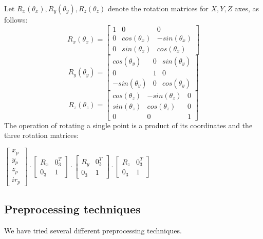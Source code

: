         Let $R_x(\theta_x), R_y(\theta_y), R_z(\theta_z)$ denote the rotation matrices
        for $X, Y, Z$ axes, as follows:
        \[
        R_x(\theta_x) =
        \begin{bmatrix}
        1 & 0 & 0\\
        0 & cos(\theta_x) & -sin(\theta_x)\\
        0 & sin(\theta_x) & cos(\theta_x)
        \end{bmatrix}
        \]
        \[
        R_y(\theta_y) =
        \begin{bmatrix}
        cos(\theta_y) & 0 & sin(\theta_y)\\
        0 & 1 & 0\\
        -sin(\theta_y) & 0 & cos(\theta_y)
        \end{bmatrix}
        \]
        \[
        R_z(\theta_z) =
        \begin{bmatrix}
        cos(\theta_z) & -sin(\theta_z) & 0\\
        sin(\theta_z) & cos(\theta_z) & 0\\
        0 & 0 & 1
        \end{bmatrix}
        \]
        The operation of rotating a single point is a product of its coordinates and the three rotation matrices:
        \begin{center}
        $
        \begin{bmatrix}
          x_p\\
          y_p\\
          z_p\\
          ir_p
        \end{bmatrix}
        \cdot
        \begin{bmatrix}
          R_x & 0_{3}^T\\
          0_{3} & 1
        \end{bmatrix}
        \cdot
        \begin{bmatrix}
          R_y & 0_{3}^T\\
          0_{3} & 1
        \end{bmatrix}
        \cdot
        \begin{bmatrix}
          R_z & 0_{3}^T\\
          0_{3} & 1
        \end{bmatrix}
        $
        \end{center}


    \subsection{Preprocessing techniques}
    We have tried several different preprocessing techniques.
